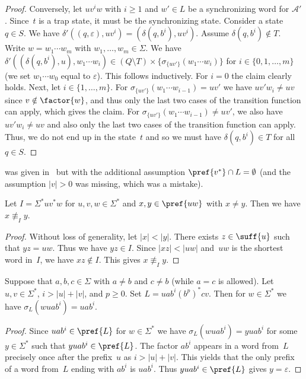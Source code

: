 \begin{proof}
	Conversely, let $uv^iw$ with $i \ge 1$ and $w' \in L$
	be a synchronizing word for $\mathcal A'$.
	Since~$t$ is a trap state, it must be the synchronizing state.
	Consider a state $q \in S$.
	We have $\delta'((q, \varepsilon), uv^i) = (\delta(q, b^i), uv^i)$.	
	Assume $\delta(q, b^i) \notin T$.
	Write $w = w_1 \cdots w_m$ with $w_1, \ldots, w_m \in \Sigma$.
	We have $\delta'((\delta(q, b^i), u), w_1 \cdots w_i) \in ( Q \setminus T ) \times \{ \sigma_{\{uv'\}}(w_1 \cdots w_i) \}$
	for $i \in \{0, 1,\ldots,m\}$ (we set $w_1 \cdots w_0$ equal to $\varepsilon$).
	This follows inductively. For $i = 0$ the claim clearly holds.
	Next, let $i \in \{1,\ldots,m\}$.
	For $\sigma_{\{uv'\}}(w_1 \cdots w_{i-1}) = uv'$
	we have $uv'w_{i} \ne uv$ since $v \notin \factor{w}$,
	and thus only the last two cases of the transition function can apply,
	which gives the claim.
	For $\sigma_{\{uv'\}}(w_1 \cdots w_{i-1}) \ne uv'$,
	we also have $uv'w_i \ne uv$
	and also only the last two cases of the transition function can apply.
	Thus, we do not end up in the state~$t$
	and so we must have $\delta(q, b^i) \in T$
	for all $q \in S$.
\end{proof}

\begin{remark}
	was given in~\cite[Prop.~8]{DBLP:conf/ictcs/Hoffman20}
	but with the additional assumption $\pref{v^*}\cap L = \emptyset$
	(and the assumption $|v| > 0$ was missing, which was a mistake).
\end{remark}

\begin{lemma} \label{constrsync:left-ideal-uvw}
	Let $I = \Sigma^* u v^* w$ for $u,v,w \in \Sigma^*$
	and $x,y \in \pref{uw}$
	with $x \ne y$.
	Then we have $x \not\equiv_I y$.
\end{lemma}
\begin{proof}
	Without loss of generality, let $|x| < |y|$.
	There exists $z \in \suff{u}$
	such that $yz = uw$.
	Thus we have $yz \in I$.
	Since $|xz| < |uw|$ and~$uw$ is the shortest word in~$I$,
	we have $xz \notin I$.
	This gives $x \not\equiv_I y$.		
\end{proof}

\begin{lemma} \label{constrsync:letter-bounded:lem:uabi}
	Suppose that $a, b, c \in \Sigma$ with $a \ne b$ and $c \ne b$ (while $a = c$ is allowed). 
	Let $u,v \in\Sigma^*$, $i > |u| + |v|$, and $p \ge 0$.	
	Set $L = uab^i(b^p)^*cv$.
	Then for $w \in \Sigma^*$ we have $\sigma_L(wuab^i) = uab^i$.
\end{lemma}
\begin{proof}
	Since $uab^i \in \pref{L}$ for $w \in \Sigma^*$
	we have $\sigma_L(w uab^i) = y uab^i$ for some $y \in \Sigma^*$
	such that $y uab^i \in \pref{L}$.
	The factor $ab^i$ appears in a word from~$L$ precisely once
	after the prefix~$u$ as $i > |u| + |v|$. 
	This yields that the only prefix of a word from~$L$
	ending with $ab^i$ is $uab^i$.
	Thus $y uab^i \in \pref{L}$
	gives $y = \varepsilon$.
\end{proof}

